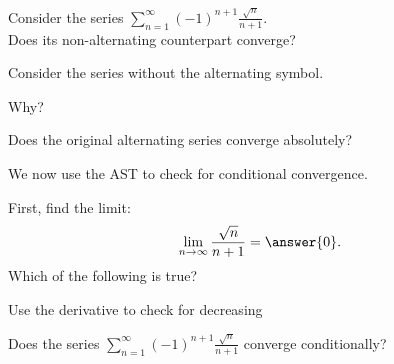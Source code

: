 \documentclass{ximera}
\begin{document}
\begin{problem}
Consider the series $\displaystyle{\sum_{n=1}^\infty (-1)^{n+1} \frac{\sqrt n}{n + 1}}$.\\
Does its non-alternating counterpart converge?
\begin{hint} 
Consider the series without the alternating symbol.
\end{hint}
\begin{multipleChoice}
\end{multipleChoice}

Why?
\begin{multipleChoice}
\end{multipleChoice}




Does the original alternating series converge absolutely?
\begin{multipleChoice}
\end{multipleChoice}

We now use the AST to check for conditional convergence.

First, find the limit:
\[
\lim_{n\to\infty} \frac{\sqrt n}{n + 1} = \answer{0}.
\]
Which of the following is true? 
\begin{hint}
Use the derivative to check for decreasing
\end{hint}
\begin{multipleChoice}
\end{multipleChoice}


Does the series $\displaystyle{\sum_{n=1}^\infty (-1)^{n+1} \frac{\sqrt n}{n + 1}}$ converge conditionally?
\begin{multipleChoice}
\end{multipleChoice}

\end{problem}
\end{document}

